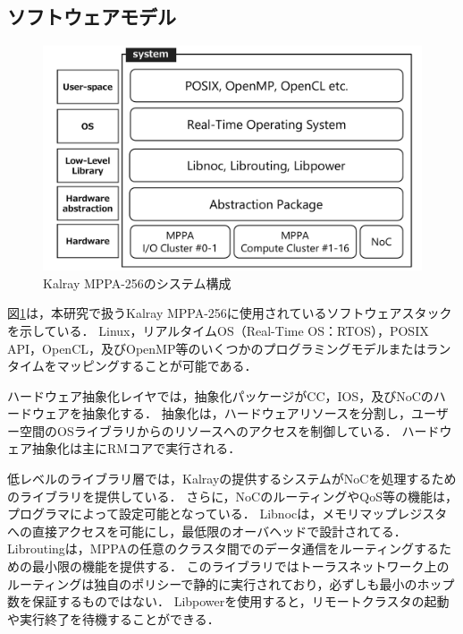 \documentclass[submit,techrep]{ipsj_v2/UTF8/ipsj}
\begin{document}
\vspace{-2mm}
\subsection{ソフトウェアモデル}
\label{sec:software_model}

\begin{figure}[t]
  \centering
  \includegraphics[width=0.8\linewidth]{../figure/softwarestack.pdf}
  \caption{\label{fig:software_stack}
    Kalray MPPA-256のシステム構成}
\end{figure}

図\ref{fig:software_stack}は，本研究で扱うKalray MPPA-256に使用されているソフトウェアスタックを示している．
Linux，リアルタイムOS（Real-Time OS：RTOS），POSIX API，OpenCL，及びOpenMP等のいくつかのプログラミングモデルまたはランタイムをマッピングすることが可能である．

ハードウェア抽象化レイヤでは，抽象化パッケージがCC，IOS，及びNoCのハードウェアを抽象化する．
抽象化は，ハードウェアリソースを分割し，ユーザー空間のOSライブラリからのリソースへのアクセスを制御している．
ハードウェア抽象化は主にRMコアで実行される．

低レベルのライブラリ層では，Kalrayの提供するシステムがNoCを処理するためのライブラリを提供している．
さらに，NoCのルーティングやQoS等の機能は，プログラマによって設定可能となっている．
Libnocは，メモリマップレジスタへの直接アクセスを可能にし，最低限のオーバヘッドで設計されてる．
Libroutingは，MPPAの任意のクラスタ間でのデータ通信をルーティングするための最小限の機能を提供する．
このライブラリではトーラスネットワーク上のルーティングは独自のポリシーで静的に実行されており，必ずしも最小のホップ数を保証するものではない．
Libpowerを使用すると，リモートクラスタの起動や実行終了を待機することができる．
\end{document}
